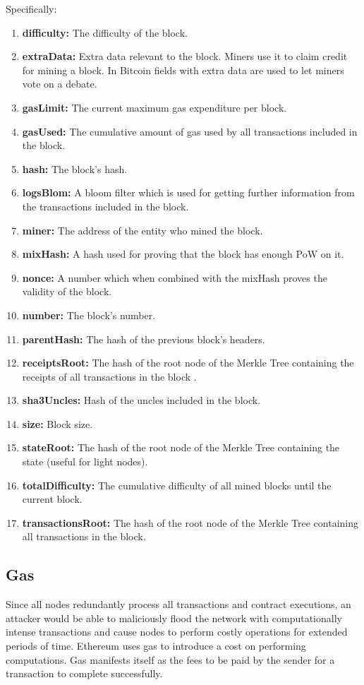 Specifically:
\begin{enumerate}
    \item \textbf{difficulty:} The difficulty of the block.
    \item \textbf{extraData:} Extra data relevant to the block. Miners use it to claim credit for mining a block. In Bitcoin fields with extra data are used to let miners vote on a debate.
    \item \textbf{gasLimit:} The current maximum gas expenditure per block.
    \item \textbf{gasUsed:} The cumulative amount of gas used by all transactions included in the block.
    \item \textbf{hash:} The block's hash.
    \item \textbf{logsBlom:} A bloom filter which is used for getting further information from the transactions included in the block.
    \item \textbf{miner:} The address of the entity who mined the block.
    \item \textbf{mixHash:} A hash used for proving that the block has enough PoW on it.
    \item \textbf{nonce:} A number which when combined with the mixHash proves the validity of the block.
    \item \textbf{number:} The block's number.
    \item \textbf{parentHash:} The hash of the previous block's headers.
    \item \textbf{receiptsRoot:} The hash of the root node of the Merkle Tree containing the receipts of all transactions in the block .
    \item \textbf{sha3Uncles:} Hash of the uncles included in the block.
    \item \textbf{size:} Block size.
    \item \textbf{stateRoot:} The hash of the root node of the Merkle Tree containing the state (useful for light nodes).
    \item \textbf{totalDifficulty:} The cumulative difficulty of all mined blocks until the current block.
    \item \textbf{transactionsRoot:} The hash of the root node of the Merkle Tree containing all transactions in the block. 
\end{enumerate}

\subsection{Gas} \label{gas}
Since all nodes redundantly process all transactions and contract executions, an attacker would be able to maliciously flood the network with computationally intense transactions and cause nodes to perform costly operations for extended periods of time. Ethereum uses gas to introduce a cost on performing computations. Gas manifests itself as the fees to be paid by the sender for a transaction to complete successfully.

